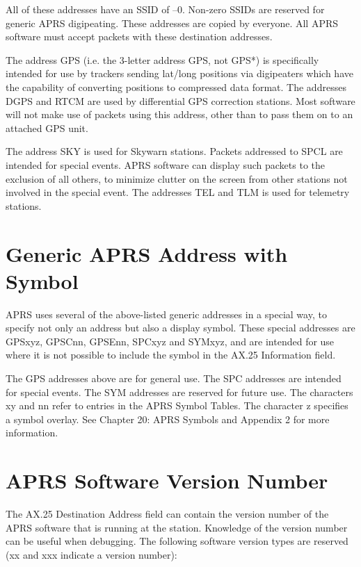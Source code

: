 All of these addresses have an SSID of –0. Non-zero SSIDs are reserved for
generic APRS digipeating.
These addresses are copied by everyone. All APRS software must accept
packets with these destination addresses.

The address GPS (i.e. the 3-letter address GPS, not GPS*) is specifically
intended for use by trackers sending lat/long positions via digipeaters which
have the capability of converting positions to compressed data format.
The addresses DGPS and RTCM are used by differential GPS correction
stations. Most software will not make use of packets using this address, other
than to pass them on to an attached GPS unit.

The address SKY is used for Skywarn stations.
Packets addressed to SPCL are intended for special events. APRS software
can display such packets to the exclusion of all others, to minimize clutter on
the screen from other stations not involved in the special event.
The addresses TEL and TLM is used for telemetry stations.

\section{Generic APRS Address with Symbol}

APRS uses several of the above-listed generic addresses in a special way, to
specify not only an address but also a display symbol. These special
addresses are GPSxyz, GPSCnn, GPSEnn, SPCxyz and SYMxyz, and are
intended for use where it is not possible to include the symbol in the AX.25
Information field.

The GPS addresses above are for general use.
The SPC addresses are intended for special events.
The SYM addresses are reserved for future use.
The characters xy and nn refer to entries in the APRS Symbol Tables. The
character z specifies a symbol overlay. See Chapter 20: APRS Symbols and
Appendix 2 for more information.

\section{APRS Software Version Number}

The AX.25 Destination Address field can contain the version number of the
APRS software that is running at the station. Knowledge of the version
number can be useful when debugging.
The following software version types are reserved (xx and xxx indicate a
version number):

